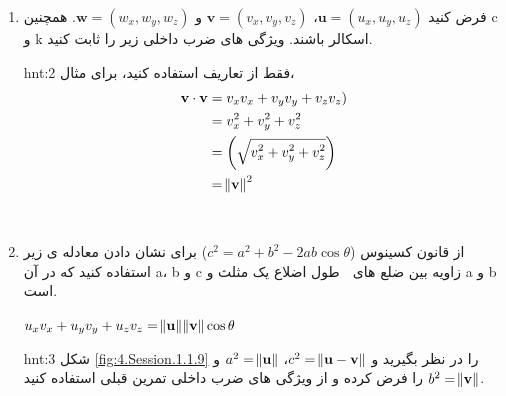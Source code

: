 {\begin{spacing}{1.5}
\begin{enumerate}
            \\
            \item {فرض کنید $\textbf{u}=(u_{x},u_{y},u_{z})$، $\textbf{v}=(v_{x},v_{y},v_{z})$ و $\textbf{w}=(w_{x},w_{y},w_{z})$. همچنین c و k اسکالر باشند. ویژگی های ضرب داخلی زیر را ثابت کنید.}
            \begin{flushleft}
            \end{flushleft}
            \begin{hint}{hnt:2}
                \Large
                فقط از تعاریف استفاده کنید، برای مثال،
                \begin{equation*}
                    \centering
                    \begin{split}
                        \textbf{v}\cdot\textbf{v}&=v_{x}v_{x}+v_{y}v_{y}+v_{z}v_{z}) \\
                        &=v_{x}^2+v_{y}^2+v_{z}^2 \\
                        &=\left( \sqrt{\displaystyle v_{x}^2+v_{y}^2+v_{z}^2} \right) \\
                        &=\norm{\textbf{v}}^2
                    \end{split}
                \end{equation*}
            \end{hint}
            \\
            \item {از قانون کسینوس ($c^2=a^2+b^2-2ab\cos\theta$) برای نشان دادن معادله ی زیر استفاده کنید که در آن a، b و c طول اضلاع یک مثلث و  زاویه بین ضلع های a و b است.}
            \begin{center}
                $u_{x}v_{x}+u_{y}v_{y}+u_{z}v_{z}=\norm{\textbf{u}}\norm{\textbf{v}}\cos\theta$
            \end{center}
            \begin{hint}{hnt:3}
                \Large
                شکل \ref{fig:4.Session.1.1.9} را در نظر بگیرید و $c^2=\norm{\textbf{u}-\textbf{v}}$، $a^2=\norm{\textbf{u}}$ و $b^2=\norm{\textbf{v}}$ را فرض کرده و از ویژگی های ضرب داخلی تمرین قبلی استفاده کنید.

\end{hint}
\end{enumerate}
\end{spacing}}
